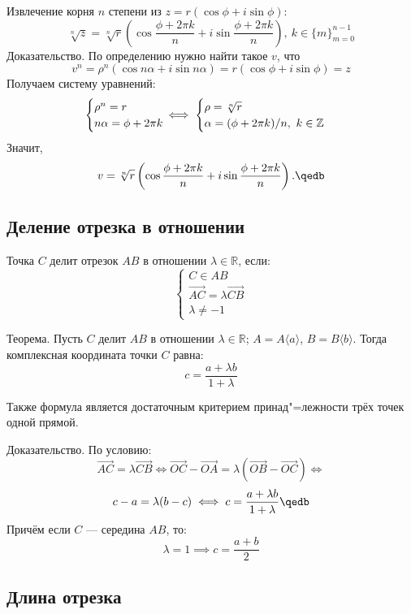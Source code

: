 Извлечение корня $n$ степени из $z=r(\cos\phi+i\sin\phi)$:
$$\sqrt[n]{z}=\sqrt[n]{r}\left(\cos\frac{\phi+2\pi k}{n}+i\sin\frac{\phi+2\pi k}{n}
\right),\ k\in\{m\}_{m=0}^{n-1}$$
{\bold Доказательство.} По определению нужно найти такое $v$, что
$$v^n=\rho^n(\cos n\alpha+i\sin n\alpha)=r(\cos\phi+i\sin\phi)=z$$
Получаем систему уравнений:
$$\begin{cases}
\rho^n=r\\
n\alpha=\phi+2\pi k
\end{cases}\hspace{-12pt}\iff\begin{cases}
\rho=\sqrt[n]{r}\\
\alpha=(\phi+2\pi k)/n,\ k\in\mathbb{Z}
\end{cases}$$
Значит,
$$v=\sqrt[n]{r}\left(\cos\frac{\phi+2\pi k}{n}+i\sin\frac{\phi+2\pi k}{n}\right).
\qedb$$

\newpage
\subsection{Деление отрезка в отношении}

Точка $C$ делит отрезок $AB$ в отношении $\lambda\in\mathbb{R}$, если:
$$\begin{cases}
C\in AB\\
\overrightarrow{AC}=\lambda\overrightarrow{CB}\\
\lambda\neq -1
\end{cases}$$
\begin{theorem}
{\bold Теорема.} Пусть $C$ делит $AB$ в отношении $\lambda\in\mathbb{R}$; $A=A\langle a\rangle$, $B=B\langle b\rangle$. Тогда комплексная координата точки $C$ равна:
$$c=\frac{a+\lambda b}{1+\lambda}$$ 
\end{theorem}

Также формула является достаточным {\ital критерием принад"=лежности трёх точек одной прямой}.

{\bold Доказательство.} По условию:
$$\overrightarrow{AC}=\lambda\overrightarrow{CB}\iff\overrightarrow{OC}-\overrightarrow{OA}=\lambda(\overrightarrow{OB}-\overrightarrow{OC})\iff$$
$$c-a=\lambda(b-c)\iff c=\frac{a+\lambda b}{1+\lambda}\qedb$$
Причём если $C$ --- середина $AB$, то:
$$\lambda=1\implies c=\frac{a+b}{2}$$

\subsection{Длина отрезка}

